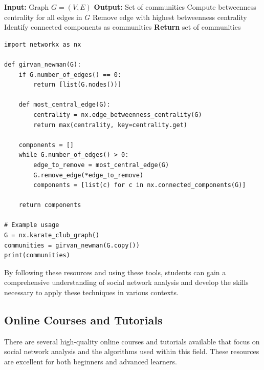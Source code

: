 \documentclass[12pt]{book} %
\begin{document}
\begin{algorithm}
\caption{Girvan-Newman Algorithm for Community Detection}
\begin{algorithmic}[1]
\State \textbf{Input:} Graph $G = (V, E)$
\State \textbf{Output:} Set of communities
    \State Compute betweenness centrality for all edges in $G$
    \State Remove edge with highest betweenness centrality
    \State Identify connected components as communities
\EndWhile
\State \textbf{Return} set of communities
\end{algorithmic}
\end{algorithm}

\FloatBarrier
\begin{lstlisting}
import networkx as nx

def girvan_newman(G):
    if G.number_of_edges() == 0:
        return [list(G.nodes())]
    
    def most_central_edge(G):
        centrality = nx.edge_betweenness_centrality(G)
        return max(centrality, key=centrality.get)
    
    components = []
    while G.number_of_edges() > 0:
        edge_to_remove = most_central_edge(G)
        G.remove_edge(*edge_to_remove)
        components = [list(c) for c in nx.connected_components(G)]
    
    return components

# Example usage
G = nx.karate_club_graph()
communities = girvan_newman(G.copy())
print(communities)
\end{lstlisting}
\FloatBarrier

By following these resources and using these tools, students can gain a comprehensive understanding of social network analysis and develop the skills necessary to apply these techniques in various contexts.

\subsection{Online Courses and Tutorials}
There are several high-quality online courses and tutorials available that focus on social network analysis and the algorithms used within this field. These resources are excellent for both beginners and advanced learners.
\end{document}
